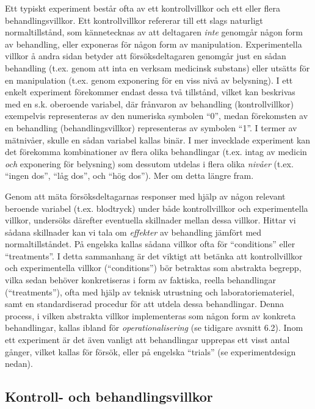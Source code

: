 \documentclass[
]{book}
\begin{document}
Ett typiskt experiment består ofta av ett kontrollvillkor och ett eller flera behandlingsvillkor. Ett kontrollvillkor refererar till ett slags naturligt normaltillstånd, som kännetecknas av att deltagaren \emph{inte} genomgår någon form av behandling, eller exponeras för någon form av manipulation. Experimentella villkor å andra sidan betyder att försöksdeltagaren genomgår just en sådan behandling (t.ex. genom att inta en verksam medicinsk substans) eller utsätts för en manipulation (t.ex. genom exponering för en viss nivå av belysning). I ett enkelt experiment förekommer endast dessa två tillstånd, vilket kan beskrivas med en s.k. oberoende variabel, där frånvaron av behandling (kontrollvillkor) exempelvis representeras av den numeriska symbolen ``0'', medan förekomsten av en behandling (behandlingsvillkor) representeras av symbolen ``1''. I termer av mätnivåer, skulle en sådan variabel kallas binär. I mer invecklade experiment kan det förekomma kombinationer av flera olika behandlingar (t.ex. intag av medicin \emph{och} exponering för belysning) som dessutom utdelas i flera olika \emph{nivåer} (t.ex. ``ingen dos'', ``låg dos'', och ``hög dos''). Mer om detta längre fram.

Genom att mäta försöksdeltagarnas responser med hjälp av någon relevant beroende variabel (t.ex. blodtryck) under både kontrollvillkor och experimentella villkor, undersöks därefter eventuella skillnader mellan dessa villkor. Hittar vi sådana skillnader kan vi tala om \emph{effekter} av behandling jämfört med normaltillståndet. På engelska kallas sådana villkor ofta för ``conditions'' eller ``treatments''. I detta sammanhang är det viktigt att betänka att kontrollvillkor och experimentella villkor (``conditions'') bör betraktas som abstrakta begrepp, vilka sedan behöver konkretiseras i form av faktiska, reella behandlingar (``treatments''), ofta med hjälp av teknisk utrustning och laboratoriemateriel, samt en standardiserad procedur för att utdela dessa behandlingar. Denna process, i vilken abstrakta villkor implementeras som någon form av konkreta behandlingar, kallas ibland för \emph{operationalisering} (se tidigare avsnitt 6.2). Inom ett experiment är det även vanligt att behandlingar upprepas ett visst antal gånger, vilket kallas för försök, eller på engelska ``trials'' (se experimentdesign nedan).

\hypertarget{sub07.4.1}{%
\subsection{Kontroll- och behandlingsvillkor}\label{sub07.4.1}}
\end{document}
